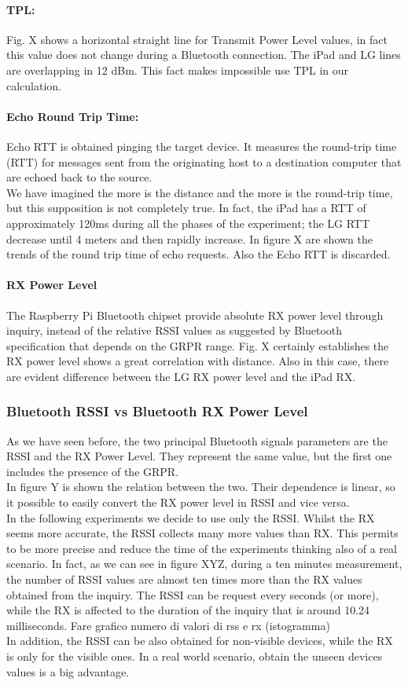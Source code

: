 \paragraph{TPL:} 
Fig. X shows a horizontal straight line for Transmit Power Level values, in fact this value does not change during a Bluetooth connection. The iPad and LG lines are overlapping in 12 dBm. This fact makes impossible use TPL in our calculation.
\paragraph{Echo Round Trip Time:} Echo RTT is obtained pinging the target device. It measures the round-trip time (RTT) for messages sent from the originating host to a destination computer that are echoed back to the source.\\
We have imagined the more is the distance and the more is the round-trip time, but this supposition is not completely true. In fact, the iPad has a RTT of approximately 120ms during all the phases of the experiment; the LG RTT decrease until 4 meters and then rapidly increase. In figure X are shown the trends of the round trip time of echo requests. Also the Echo RTT is discarded.
\paragraph{RX Power Level}
The Raspberry Pi Bluetooth chipset provide absolute RX power level through inquiry, instead of the relative RSSI values as suggested by Bluetooth specification that depends on the GRPR range. Fig. X certainly establishes the RX power level shows a great correlation with distance. Also in this case, there are evident difference between the LG RX power level and the iPad RX.

\subsubsection{Bluetooth RSSI vs Bluetooth RX Power Level}
As we have seen before, the two principal Bluetooth signals parameters are the RSSI and the RX Power Level. 
They represent the same value, but the first one includes the presence of the GRPR. \\
In figure Y is shown the relation between the two. Their dependence is linear, so it possible to easily convert the RX power level in RSSI  and vice versa.\\
In the following experiments we decide to use only the RSSI. Whilst the RX seems more accurate, the RSSI collects many more values than RX. This permits to be more precise and reduce the time of the experiments thinking also of a real scenario. In fact, as we can see in figure XYZ,  during a ten minutes measurement, the number of RSSI values are almost ten times more than the RX values obtained from the inquiry. The RSSI can be request every seconds (or more), while the RX is affected to the duration of the inquiry that is around 10.24 milliseconds.
Fare grafico numero di valori di rss e rx (istogramma)\\
In addition, the RSSI can be also obtained for non-visible devices, while the RX is only for the visible ones. In a real world scenario, obtain the unseen devices values is a big advantage.

